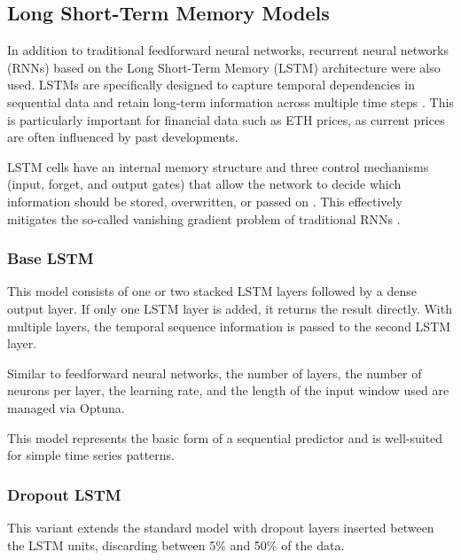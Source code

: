 

\subsection{Long Short-Term Memory Models}
\label{chap:lstm}

In addition to traditional feedforward neural networks, recurrent neural networks (RNNs) based on the Long Short-Term Memory (LSTM) architecture were also used.
LSTMs are specifically designed to capture temporal dependencies in sequential data and retain long-term information across multiple time steps \cite{lstm-usage}.
This is particularly important for financial data such as ETH prices, as current prices are often influenced by past developments.

LSTM cells have an internal memory structure and three control mechanisms (input, forget, and output gates) that allow the network to decide which information should be stored, overwritten, or passed on \cite{lstm-cell}.
This effectively mitigates the so-called vanishing gradient problem of traditional RNNs \cite{lstm-gradient-problem}.

\subsubsection{Base LSTM}

This model consists of one or two stacked LSTM layers followed by a dense output layer.
If only one LSTM layer is added, it returns the result directly.
With multiple layers, the temporal sequence information is passed to the second LSTM layer.

Similar to feedforward neural networks, the number of layers, the number of neurons per layer, the learning rate, and the length of the input window used are managed via Optuna.

This model represents the basic form of a sequential predictor and is well-suited for simple time series patterns.



\subsubsection{Dropout LSTM}

This variant extends the standard model with dropout layers inserted between the LSTM units, discarding between 5\% and 50\% of the data.

